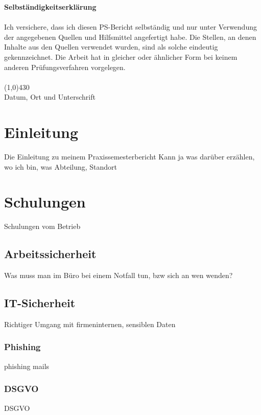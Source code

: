 \documentclass[a4paper, 12pt]{article}
\begin{document}
\newpage
\tableofcontents            %
\newpage                    %

{\bfseries Selbständigkeitserklärung}\\ \\
Ich versichere, dass ich diesen PS-Bericht selbständig und nur unter Verwendung der angegebenen
Quellen und Hilfsmittel angefertigt habe. Die Stellen, an denen Inhalte aus den Quellen verwendet
wurden, sind als solche eindeutig gekennzeichnet. Die Arbeit hat in gleicher oder ähnlicher Form bei
keinem anderen Prüfungsverfahren vorgelegen. \\
\vspace{1.0cm} \\
\line(1,0){430} \\
Datum, Ort und Unterschrift\\

\newpage
\section{Einleitung}\label{Einleitung} 
Die Einleitung zu meinem Praxissemesterbericht
Kann ja was darüber erzählen, wo ich bin, was Abteilung, Standort

\newpage
\section{Schulungen}\label{Schulungen}
Schulungen vom Betrieb

\subsection{Arbeitssicherheit}\label{Arbeitssicherheit}
Was muss man im Büro bei einem Notfall tun, bzw sich an wen wenden?

\subsection{IT-Sicherheit}\label{IT-Sicherheit}
Richtiger Umgang mit firmeninternen, sensiblen Daten

\subsubsection{Phishing}\label{Phishing}
phishing mails

\subsubsection{DSGVO}\label{DSGVO}
DSGVO
\end{document}

